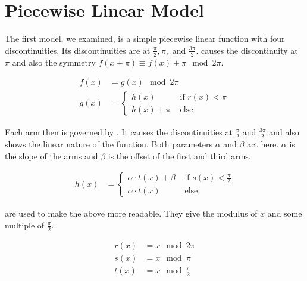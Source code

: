 \section{Piecewise Linear Model}

The first model, we examined, is a simple piecewise linear function with four discontinuities.
Its discontinuities are at $\frac{\pi}{2}, \pi,$ and $\frac{3 \pi}{2}$.
 causes the discontinuity at $\pi$ and also the symmetry $f(x + \pi) \equiv f(x) + \pi \mod 2 \pi$.

\begin{align}
    f(x) & = g(x) \mod 2 \pi \\
    g(x) & = \begin{cases}
        h(x) & \text{ if } r(x) < \pi \\
        h(x) + \pi & \text{ else}
    \end{cases} \label{equ:pcw.lin.sympi}
\end{align}

Each arm then is governed by .
It causes the discontinuities at $\frac{\pi}{2}$ and $\frac{3 \pi}{2}$ and also shows the linear nature of the function.
Both parameters $\alpha$ and $\beta$ act here.
$\alpha$ is the slope of the arms and $\beta$ is the offset of the first and third arms.

\begin{align}
    h(x) & = \begin{cases}
        \alpha \cdot t(x) + \beta & \text{ if } s(x) < \frac{\pi}{2} \\
        \alpha \cdot t(x) & \text{ else}
    \end{cases} \label{equ:pcw.lin.discpihalves}
\end{align}

 are used to make the above more readable.
They give the modulus of $x$ and some multiple of $\frac{\pi}{2}$.

\begin{align}
    r(x) & = x \mod 2 \pi \label{equ:pcw.lin.r} \\
    s(x) & = x \mod \pi \\
    t(x) & = x \mod \frac{\pi}{2} \label{equ:pcw.lin.t}
\end{align}
